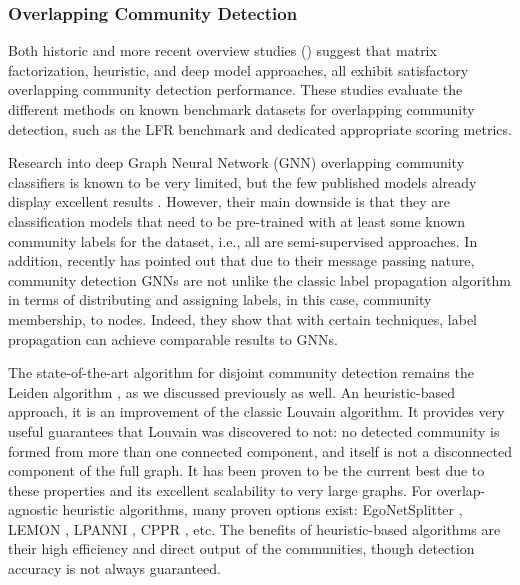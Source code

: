 \subsubsection{Overlapping Community Detection}
Both historic and more recent overview studies (\cite{xie_overlapping_2013, li_deeper_2018, liu_deep_2020, vieira_comparative_2020}) suggest that matrix factorization, heuristic, and deep model approaches, all exhibit satisfactory overlapping community detection performance. These studies evaluate the different methods on known benchmark datasets for overlapping community detection, such as the LFR benchmark \cite{lancichinetti_benchmarks_2009} and dedicated appropriate scoring metrics.

Research into deep Graph Neural Network (GNN) overlapping community classifiers is known to be very limited, but the few published models already display excellent results \cite{jia_communitygan_2019, wang_unifying_2020}. However, their main downside is that they are classification models that need to be pre-trained with at least some known community labels for the dataset, i.e., all are semi-supervised approaches. In addition, recently \cite{huang_combining_2020} has pointed out that due to their message passing nature, community detection GNNs are not unlike the classic label propagation algorithm in terms of distributing and assigning labels, in this case, community membership, to nodes. Indeed, they show that with certain techniques, label propagation can achieve comparable results to GNNs.

The state-of-the-art algorithm for disjoint community detection remains the Leiden algorithm \cite{traag_louvain_2019}, as we discussed previously as well. An heuristic-based approach, it is an improvement of the classic Louvain algorithm. It provides very useful guarantees that Louvain was discovered to not: no detected community is formed from more than one connected component, and itself is not a disconnected component of the full graph. It has been proven to be the current best due to these properties and its excellent scalability to very large graphs. For overlap-agnostic heuristic algorithms, many proven options exist: EgoNetSplitter \cite{epasto_ego-splitting_2017}, LEMON \cite{li_local_2018}, LPANNI \cite{lu_lpanni_2019}, CPPR \cite{gao_overlapping_2021}, etc. The benefits of heuristic-based algorithms are their high efficiency and direct output of the communities, though detection accuracy is not always guaranteed.

